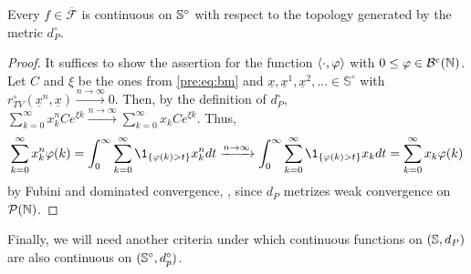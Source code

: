 \begin{Lemma}\label{pre:l:conti}
Every $f\in\overline{\mathcal F}$ is continuous on $\mathbb{S}^\circ$ 
with respect to the topology generated by the metric $d_{P}^\circ$.
\end{Lemma}

\begin{proof}
It suffices to show the assertion for the function $\langle \cdot,\varphi \rangle$ with 
$0 \leq \varphi \in \mathcal{B}^{e}\!\left(\mathbb{N}\right)$. Let $C$ and $\xi$ be the ones from
\eqref{pre:eq:bm} and $\underline x, \underline x^1, \underline x^2,...\in\mathbb S^\circ$ with 
$r^\circ_{TV}(\underline x^n, \underline x) \xrightarrow{n\to\infty} 0$. 
Then, by the definition of $d_{P}^\circ$, 
$\sum_{k=0}^\infty x_k^n C e^{\xi k} \xrightarrow{n\to\infty} \sum_{k=0}^\infty x_k C
e^{\xi k}$. 
Thus,
\begin{align*}
\sum_{k=0}^\infty x_k^n \varphi(k) 
= \int_0^\infty \sum_{k=0}^\infty \1_{\{\varphi(k)>t\}} x_k^n dt
\xrightarrow{n\to\infty} \int_0^\infty \sum_{k=0}^\infty \1_{\{\varphi(k)>t\}} x_k dt 
= \sum_{k=0}^\infty x_k \varphi(k)
\end{align*}
by Fubini and dominated convergence, \citep[Theorem~1.21]{kallenberg_foundations_1997}, since
$d_{P}$ metrizes weak convergence on $\mathcal P(\mathbb{N})$.
\end{proof}

% 

\noindent
Finally, we will need another criteria under which continuous functions on $(\mathbb{S},d_P)$ are
also continuous on $(\mathbb{S}^\circ,d_p^\circ)$.  


